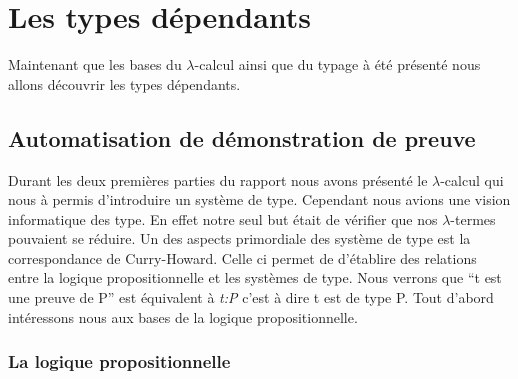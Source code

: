 \documentclass {article}
\theoremstyle{definition}
\theoremstyle{remark}
\begin{document}














\section{Les types dépendants}

Maintenant que les bases du $\lambda$-calcul ainsi que du typage à été présenté 
nous allons découvrir les types dépendants. 
 
\subsection{Automatisation de démonstration de preuve}
Durant les deux premières parties du rapport nous avons présenté le $\lambda$-calcul
qui nous à permis d'introduire un système de type. Cependant nous avions une vision 
informatique des type. En effet notre seul but était de vérifier que nos $\lambda$-termes
pouvaient se réduire. 
Un des aspects primordiale des système de type est la correspondance de Curry-Howard.
Celle ci permet de d'établire des relations entre la logique propositionnelle et les systèmes 
de type. Nous verrons que ``t est une preuve de P'' est équivalent à \emph{t:P} c'est à dire
t est de type P.
Tout d'abord intéressons nous aux bases de la logique propositionnelle.
\subsubsection{La logique propositionnelle}
\end{document}
